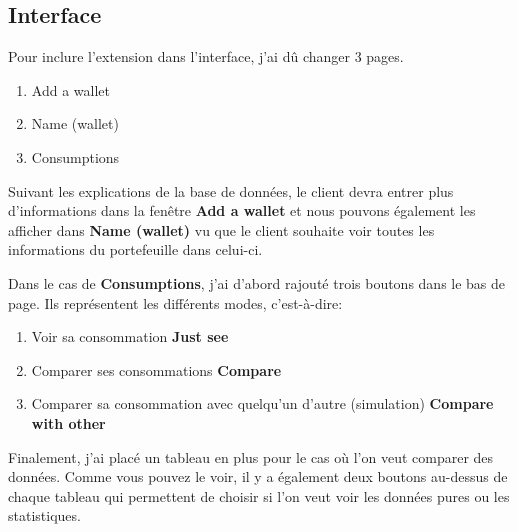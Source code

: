 \subsection{Interface}

\begin{flushleft}
Pour inclure l'extension dans l'interface, j'ai dû changer 3 pages.
\end{flushleft}

\begin{enumerate}[-]
\item Add a wallet
\item Name (wallet)
\item Consumptions
\end{enumerate}

\begin{flushleft}
Suivant les explications de la base de données, le client devra entrer plus d'informations dans la fenêtre \textbf{Add a wallet} et nous pouvons également les afficher dans \textbf{Name (wallet)} vu que le client souhaite voir toutes les informations du portefeuille dans celui-ci.
\end{flushleft}

\begin{flushleft}
Dans le cas de \textbf{Consumptions}, j'ai d'abord rajouté trois boutons dans le bas de page. Ils représentent les différents modes, c'est-à-dire:
\end{flushleft}

\begin{enumerate}[-]
\item Voir sa consommation \textbf{Just see}
\item Comparer ses consommations \textbf{Compare}
\item Comparer sa consommation avec quelqu'un d'autre (simulation) \textbf{Compare with other}
\end{enumerate}

\begin{flushleft}
Finalement, j'ai placé un tableau en plus pour le cas où l'on veut comparer des données. Comme vous pouvez le voir, il y a également deux boutons au-dessus de chaque tableau qui permettent de choisir si l'on veut voir les données pures ou les statistiques.
\end{flushleft}


